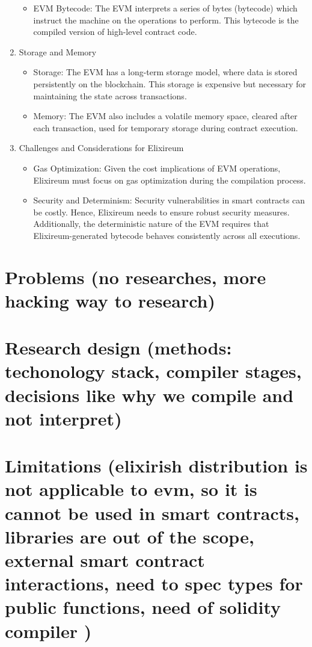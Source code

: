 \begin{enumerate}
\begin{itemize}
              \item           EVM Bytecode: The EVM interprets a series of bytes (bytecode) which instruct the machine on the operations to perform. This bytecode is the compiled version of high-level contract code.
          \end{itemize}
    \item Storage and Memory
          \begin{itemize}
              \item   Storage: The EVM has a long-term storage model, where data is stored persistently on the blockchain. This storage is expensive but necessary for maintaining the state across transactions.
              \item         Memory: The EVM also includes a volatile memory space, cleared after each transaction, used for temporary storage during contract execution.
          \end{itemize}
    \item Challenges and Considerations for Elixireum
          \begin{itemize}
              \item Gas Optimization: Given the cost implications of EVM operations, Elixireum must focus on gas optimization during the compilation process.
              \item Security and Determinism: Security vulnerabilities in smart contracts can be costly. Hence, Elixireum needs to ensure robust security measures. Additionally, the deterministic nature of the EVM requires that Elixireum-generated bytecode behaves consistently across all executions.
          \end{itemize}



\end{enumerate}




\section{Problems (no researches, more hacking way to research)}
\label{}

\section{Research design (methods: techonology stack, compiler stages, decisions like why we compile and not interpret)}
\label{}

\section{Limitations (elixirish distribution is not applicable to evm, so it is cannot be used in smart contracts, libraries are out of the scope, external smart contract interactions, need to spec types for public functions, need of solidity compiler )}
\label{}

